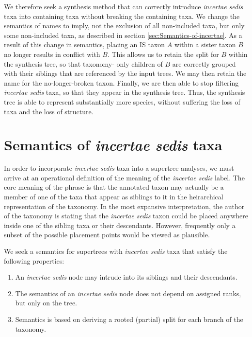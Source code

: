\documentclass[english]{article}
\begin{document}
We therefore seek a synthesis method that can correctly introduce
\emph{incertae sedis} taxa into containing taxa without breaking the
containing taxa.
We change the semantics of names to imply, not the
exclusion of all non-included taxa, but only some non-included taxa,
as described in section \ref{sec:Semantics-of-incertae}.
As a result
of this change in semantics, placing an IS taxon $A$ within a sister
taxon $B$ no longer results in conflict with $B$.
This allows us to
retain the split for $B$ within the synthesis tree, so that taxonomy-
only children of $B$ are correctly grouped with their siblings that
are referenced by the input trees.
We may then retain the name for the
no-longer-broken taxon.
Finally, we are then able to stop filtering
\emph{incertae sedis} taxa, so that they appear in the synthesis tree.
Thus, the synthesis tree is able to represent substantially more
species, without suffering the loss of taxa and the loss of structure.


\section{\label{sec:Semantics-of-incertae}Semantics of \emph{incertae
sedis} taxa}

In order to incorporate \emph{incertae sedis }taxa into a supertree
analyses, we must arrive at an operational definition of the meaning
of the \emph{incertae sedis} label.
The core meaning of the phrase is
that the annotated taxon may actually be a member of one of the taxa
that appear as siblings to it in the heirarchical representation of
the taxonomy.
In the most expansive interpretation, the author of the
taxonomy is stating that the \emph{incertae sedis} taxon could be
placed anywhere inside one of the sibling taxa or their descendants.
However, frequently only a subset of the possible placement points
would be viewed as plausible.

We seek a semantics for supertrees with \emph{incertae sedis }taxa
that satisfy the following properties:
\begin{enumerate}
    \item An \emph{incertae sedis} node may intrude into its siblings and their
descendants.
    \item The semantics of an \emph{incertae sedis} node does not depend on assigned ranks, but only on the tree.
    \item Semantics is based on deriving a rooted (partial) split for each branch of the taxonomy.
\end{enumerate}
\end{document}
